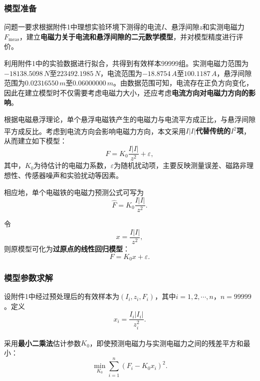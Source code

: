 \documentclass[a4paper]{nmmcm}
\newcommand{\upcite}[1]{\textsuperscript{\cite{#1}}}
\begin{document}
\subsubsection{模型准备}

问题一要求根据附件1中理想实验环境下测得的电流$I$、悬浮间隙$z$和实测电磁力$F_{\text{meas}}$，建立\textbf{电磁力关于电流和悬浮间隙的二元数学模型}，并对模型精度进行评价。

利用附件1中的实验数据进行拟合，共得到有效样本99999组。实测电磁力范围为$-18138.5098\,N$至$223492.1985\,N$，电流范围为$-18.8754\,A$至$100.1187\,A$，悬浮间隙范围为$0.02316550\,m$至$0.06000000\,m$。由数据范围可知，电流存在正负方向变化，因此在建立模型时不仅需要考虑电磁力大小，还应考虑\textbf{电流方向对电磁力方向的影响}。

根据电磁悬浮理论，单个悬浮电磁铁产生的电磁力与电流平方成正比，与悬浮间隙平方成反比\upcite{3}\upcite{4}。考虑到电流方向会影响电磁力方向，本文采用\textbf{$I|I|$代替传统的$I^2$项}，从而建立如下模型：
\begin{equation}
F=K_0\frac{I|I|}{z^2}+\varepsilon,
\end{equation}
其中，$K_0$为待估计的电磁力系数，$\varepsilon$为随机扰动项，主要反映测量误差、磁路非理想性、传感器噪声和实验扰动等因素。

相应地，单个电磁铁的电磁力预测公式可写为
\begin{equation}
\hat{F}=K_0\frac{I|I|}{z^2}.
\end{equation}

令
\begin{equation}
x=\frac{I|I|}{z^2},
\end{equation}
则原模型可化为\textbf{过原点的线性回归模型}：
\begin{equation}
F=K_0x+\varepsilon.
\end{equation}

\subsubsection{模型参数求解}

设附件1中经过预处理后的有效样本为$(I_i,z_i,F_i)$，其中$i=1,2,\cdots,n$，$n=99999$。定义
\begin{equation}
x_i=\frac{I_i|I_i|}{z_i^2}.
\end{equation}

采用\textbf{最小二乘法}估计参数$K_0$\upcite{8}，即使预测电磁力与实测电磁力之间的残差平方和最小：
\begin{equation}
\min_{K_0}\sum_{i=1}^{n}(F_i-K_0x_i)^2.
\end{equation}
\end{document}
